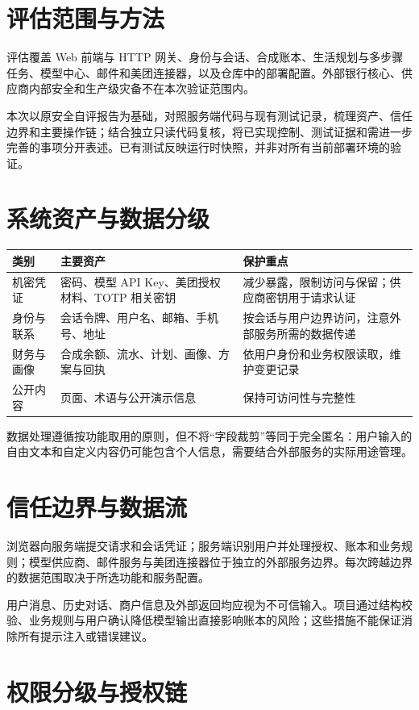 \documentclass[journal,wp,nowatermark,nobib,clean]{paper}
\begin{document}
\section{评估范围与方法}
评估覆盖 Web 前端与 HTTP 网关、身份与会话、合成账本、生活规划与多步骤任务、模型中心、邮件和美团连接器，以及仓库中的部署配置。外部银行核心、供应商内部安全和生产级灾备不在本次验证范围内。

本次以原安全自评报告为基础，对照服务端代码与现有测试记录，梳理资产、信任边界和主要操作链；结合独立只读代码复核，将已实现控制、测试证据和需进一步完善的事项分开表述。已有测试反映运行时快照，并非对所有当前部署环境的验证。

\section{系统资产与数据分级}
\begin{longtable}{L{.16\textwidth}L{.32\textwidth}L{.39\textwidth}}
\toprule 类别 & 主要资产 & 保护重点 \\\midrule\endhead
机密凭证 & 密码、模型 API Key、美团授权材料、TOTP 相关密钥 & 减少暴露，限制访问与保留；供应商密钥用于请求认证 \\
身份与联系 & 会话令牌、用户名、邮箱、手机号、地址 & 按会话与用户边界访问，注意外部服务所需的数据传递 \\
财务与画像 & 合成余额、流水、计划、画像、方案与回执 & 依用户身份和业务权限读取，维护变更记录 \\
公开内容 & 页面、术语与公开演示信息 & 保持可访问性与完整性 \\\bottomrule
\end{longtable}
数据处理遵循按功能取用的原则，但不将“字段裁剪”等同于完全匿名：用户输入的自由文本和自定义内容仍可能包含个人信息，需要结合外部服务的实际用途管理。

\section{信任边界与数据流}
浏览器向服务端提交请求和会话凭证；服务端识别用户并处理授权、账本和业务规则；模型供应商、邮件服务与美团连接器位于独立的外部服务边界。每次跨越边界的数据范围取决于所选功能和服务配置。

用户消息、历史对话、商户信息及外部返回均应视为不可信输入。项目通过结构校验、业务规则与用户确认降低模型输出直接影响账本的风险；这些措施不能保证消除所有提示注入或错误建议。

\section{权限分级与授权链}
\end{document}
